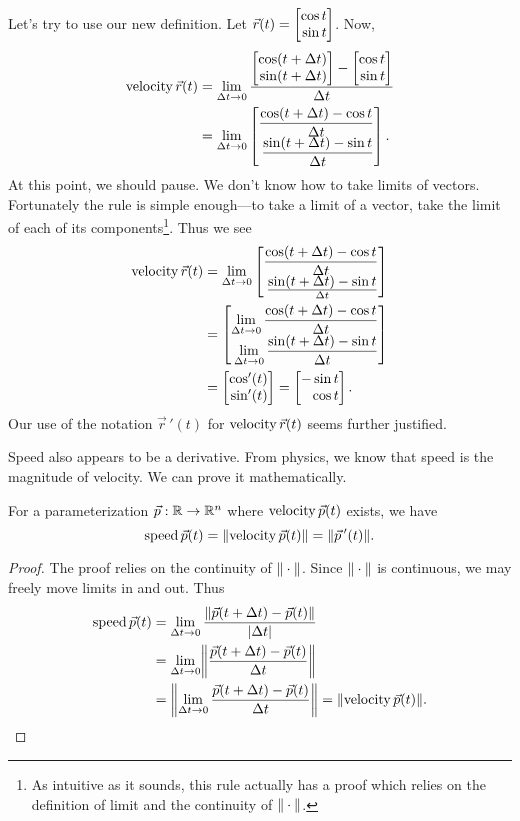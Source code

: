 Let's try to use our new definition.  Let $\vec r(t) = \mat{\cos t\\\sin t}$.  Now,
\begin{align*}
	\Vel \vec r(t) &=\lim_{\Delta t\to 0} \frac{\mat{\cos(t+\Delta t)\\\sin(t+\Delta t)} - \mat{\cos t\\\sin t}}{\Delta t}\\
	&=\lim_{\Delta t\to 0} \mat{
		\displaystyle\frac{\cos(t+\Delta t)-\cos t}{\Delta t} \\\displaystyle\frac{\sin(t+\Delta t)-\sin t}{\Delta t}
		}.
\end{align*}
At this point, we should pause.  We don't know how to take limits of vectors.  Fortunately the rule
is simple enough---to take a limit of a vector, take the limit of each of its components\footnote{
	As intuitive as it sounds, this rule actually has a proof which relies on the definition
	of limit and the continuity of $\lVert\:\cdot\:\rVert$.
}.  Thus we see
\begin{align*}
	\Vel \vec r(t) 
	&=\lim_{\Delta t\to 0} \mat{
		\displaystyle\frac{\cos(t+\Delta t)-\cos t}{\Delta t} \\\frac{\displaystyle\sin(t+\Delta t)-\sin t}{\Delta t}}\\
	&=\mat{
		\displaystyle\lim_{\Delta t\to 0} \frac{\cos(t+\Delta t)-\cos t}{\Delta t} \\\displaystyle\lim_{\Delta t\to 0} \frac{\sin(t+\Delta t)-\sin t}{\Delta t}
		}\\
	&=\mat{\cos'(t)\\\sin'(t)} = \mat{-\sin t\\\cos t}.
\end{align*}
Our use of the notation $\vec r\,'(t)$ for $\operatorname{velocity} \vec r(t)$ seems further justified.

Speed also appears to be a derivative.  From physics, we know that speed is the magnitude of 
velocity.  We can prove it mathematically.
\begin{theorem}
	For a parameterization $\vec p:\mathbb{R}\to\mathbb{R}^n$ where $\operatorname{velocity} \vec p(t)$
	exists, we have
	\[
		\operatorname{speed} \vec p(t) = \lVert\operatorname{velocity} \vec p(t)\rVert = \lVert\vec p\,'(t)\rVert.
	\]
\end{theorem}
\begin{proof}
	The proof relies on the continuity of $\lVert\:\cdot\:\rVert$.  Since $\lVert\:\cdot\:\rVert$
	is continuous, we may freely move limits in and out.  Thus
	\begin{align*}
		\Speed \vec p(t) &= \lim_{\Delta t\to 0} \frac{\norm{\vec p(t+\Delta t) - \vec p(t)}}{\abs{\Delta t}}\\
		&= \lim_{\Delta t\to 0} \norm*{\frac{\vec p(t+\Delta t) - \vec p(t)}{\Delta t}}\\
		&=\norm*{\lim_{\Delta t\to 0} \frac{\vec p(t+\Delta t) - \vec p(t)}{\Delta t}}
		=\norm{\Vel \vec p(t)}.
	\end{align*}
\end{proof}


